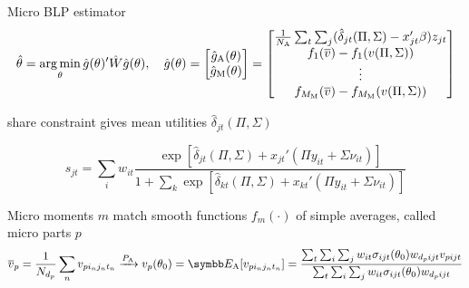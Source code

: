 \documentclass[aspectratio=169,10pt]{beamer}
\begin{document}
\begin{frame}[label=estimator]{Micro BLP estimator}
    \vspace{-0.5em}
    \begin{equation*}
        \hat{\theta} = \operatorname*{arg\,min}_\theta \hat{g}(\theta)'\hat{W}\hat{g}(\theta), \quad \hat{g}(\theta) =
        \begin{bmatrix}
            \hat{g}_\mathrm{A}(\theta) \\
            \hat{g}_\mathrm{M}(\theta)
        \end{bmatrix}
        =
        \begin{bmatrix}
            \frac{1}{N_\mathrm{A}} \sum_t \sum_j (\hat{\delta}_{jt}(\Pi, \Sigma) - x_{jt}'\beta) z_{jt} \\
            f_1(\overline{v}) - f_1(v(\Pi, \Sigma)) \\
            \vdots \\
            f_{M_\mathrm{M}}(\overline{v}) - f_{M_\mathrm{M}}(v(\Pi, \Sigma))
        \end{bmatrix}
    \end{equation*}
    \begin{wideitemize}
        \item {} share constraint gives mean utilities $\hat{\delta}_{jt}(\Pi, \Sigma)$
    \end{wideitemize}
    \begin{equation*}
        s_{jt} = \sum_i w_{it}  \frac{\exp[\hat{\delta}_{jt}(\Pi, \Sigma) + x_{jt}'(\Pi y_{it} + \Sigma \nu_{it})]}{1 + \sum_k \exp[\hat{\delta}_{kt}(\Pi, \Sigma) + x_{kt}'(\Pi y_{it} + \Sigma \nu_{it})]}
    \end{equation*}
    \begin{wideitemize}
        \item Micro moments $m$ match smooth functions $f_m(\cdot)$ of simple averages, called micro parts $p$
        \begin{equation*}
            \overline{v}_p = \frac{1}{N_{d_p}} \sum_n v_{pi_nj_nt_n} \xrightarrow{P_\mathrm{A}} v_p(\theta_0) = \E_\mathrm{A}[v_{pi_nj_nt_n}] = \frac{\sum_t \sum_i \sum_j w_{it} \sigma_{ijt}(\theta_0) w_{d_pijt} v_{pijt}}{\sum_t \sum_i \sum_j w_{it} \sigma_{ijt}(\theta_0) w_{d_pijt}}
        \end{equation*}
    \end{wideitemize}
\end{frame}



\end{document}
